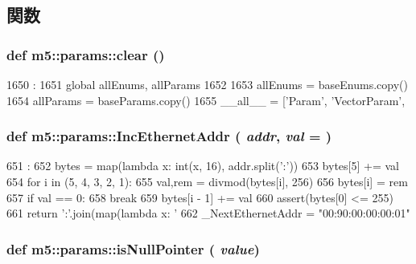 \subsection{関数}
\hypertarget{namespacem5_1_1params_adba0da38f060e3d71fae93062019832a}{
\subsubsection[{clear}]{\setlength{\rightskip}{0pt plus 5cm}def m5::params::clear ()}}
\label{namespacem5_1_1params_adba0da38f060e3d71fae93062019832a}



\begin{DoxyCode}
1650            :
1651     global allEnums, allParams
1652 
1653     allEnums = baseEnums.copy()
1654     allParams = baseParams.copy()
1655 
__all__ = ['Param', 'VectorParam',
\end{DoxyCode}
\hypertarget{namespacem5_1_1params_ae5a3c9a388a74d64dcf5045a04d3aaee}{
\subsubsection[{IncEthernetAddr}]{\setlength{\rightskip}{0pt plus 5cm}def m5::params::IncEthernetAddr ( {\em addr}, \/   {\em val} = {})}}
\label{namespacem5_1_1params_ae5a3c9a388a74d64dcf5045a04d3aaee}



\begin{DoxyCode}
651                                   :
652     bytes = map(lambda x: int(x, 16), addr.split(':'))
653     bytes[5] += val
654     for i in (5, 4, 3, 2, 1):
655         val,rem = divmod(bytes[i], 256)
656         bytes[i] = rem
657         if val == 0:
658             break
659         bytes[i - 1] += val
660     assert(bytes[0] <= 255)
661     return ':'.join(map(lambda x: '%
662 
_NextEthernetAddr = "00:90:00:00:00:01"
\end{DoxyCode}
\hypertarget{namespacem5_1_1params_aeb1d02adba143b515f1132bd9b873163}{
\subsubsection[{isNullPointer}]{\setlength{\rightskip}{0pt plus 5cm}def m5::params::isNullPointer ( {\em value})}}
\label{namespacem5_1_1params_aeb1d02adba143b515f1132bd9b873163}



